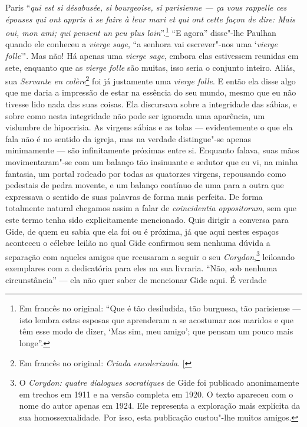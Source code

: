 Paris ``\emph{qui est si désabusée, si bourgeoise, si parisienne --- ça
vous rappelle ces épouses qui ont appris à se faire à leur mari et qui
ont cette façon de dire: Mais oui, mon ami; qui pensent un peu plus
loin}''.\footnote{Em francês no original: ``Que é tão desiludida, tão burguesa, tão
  parisiense --- isto lembra estas esposas que aprenderam a se acostumar
  aos maridos e que têm esse modo de dizer, `Mas sim, meu amigo'; que
  pensam um pouco mais longe''. \versal{[N.~T.]}} ``E agora''
disse"-lhe Paulhan quando ele conheceu a \emph{vierge sage}, ``a senhora
vai escrever"-nos uma `\emph{vierge folle}'". Mas não! Há apenas uma
\emph{vierge sage}, embora elas estivessem reunidas em sete, enquanto
que as \emph{vierge folle} são muitas, isso seria o conjunto inteiro.
Aliás, sua \emph{Servante en colère}\footnote{Em francês no original: \emph{Criada encolerizada}. {[}\versal{N.~T.}{]}} foi já justamente uma \emph{vierge
folle}. E então ela disse algo que me daria a impressão de estar na
essência do seu mundo, mesmo que eu não tivesse lido nada das suas
coisas. Ela discursava sobre a integridade das sábias, e sobre como
nesta integridade não pode ser ignorada uma aparência, um vislumbre de
hipocrisia. As virgens sábias e as tolas --- evidentemente o que ela fala
não é no sentido da igreja, mas na verdade distingue"-se apenas
minimamente --- são infinitamente próximas entre si. Enquanto falava,
suas mãos movimentaram"-se com um balanço tão insinuante e sedutor que eu
vi, na minha fantasia, um portal rodeado por todas as quatorzes virgens,
repousando como pedestais de pedra movente, e um balanço contínuo de uma
para a outra que expressava o sentido de suas palavras de forma mais
perfeita. De forma totalmente natural chegamos assim a falar de
\emph{coincidentia oppositorum}, sem que este termo tenha sido
explicitamente mencionado. Quis dirigir a conversa para Gide, de quem eu
sabia que ela foi ou é próxima, já que aqui nestes espaços aconteceu o
célebre leilão no qual Gide confirmou sem nenhuma dúvida a separação com
aqueles amigos que recusaram a seguir o seu \emph{Corydon},\footnote{O \emph{Corydon: quatre dialogues socratiques} de Gide foi publicado
  anonimamente em trechos em 1911 e na versão completa em 1920. O texto
  apareceu com o nome do autor apenas em 1924. Ele representa a
  exploração mais explícita da sua homossexualidade. Por isso, esta
  publicação custou"-lhe muitos amigos. \versal{[N.~O.]}} leiloando exemplares com a
dedicatória para eles na sua livraria. ``Não, sob nenhuma
circunstância'' --- ela não quer saber de mencionar Gide aqui. É verdade
